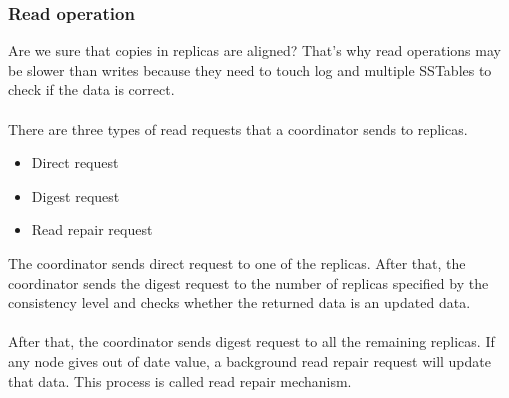 \documentclass[10pt,a4paper]{article}
\newcommand{\nline}{\\~\\}
\begin{document}
\subsubsection{Read operation}
Are we sure that copies in replicas are aligned? That's why read operations may be slower than writes because they need to touch log and multiple SSTables to check if the data is correct. \nline
There are three types of read requests that a coordinator sends to replicas.
\begin{itemize}
	\item Direct request
	\item Digest request
	\item Read repair request
\end{itemize}
The coordinator sends direct request to one of the replicas. After that, the coordinator sends the digest request to the number of replicas specified by the consistency level and checks whether the returned data is an updated data.
\nline
After that, the coordinator sends digest request to all the remaining replicas. If any node gives out of date value, a background read repair request will update that data. This process is called read repair mechanism.
\end{document}
